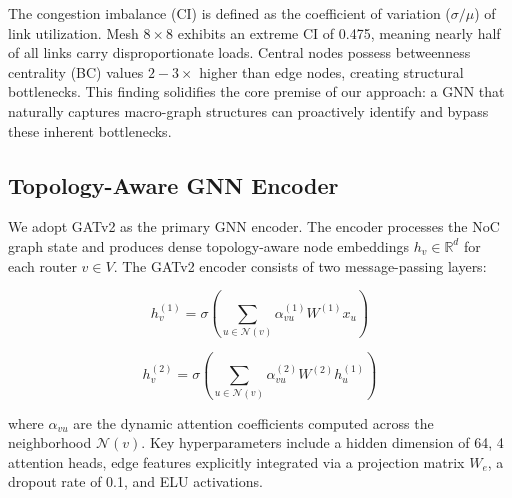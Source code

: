 \begin{table}[h]
\centering
\caption{Graph metrics across NoC topologies}
\label{tab:metrics}
\end{table}

The congestion imbalance (CI) is defined as the coefficient of variation ($\sigma/\mu$) of link utilization. Mesh $8\times8$ exhibits an extreme CI of 0.475, meaning nearly half of all links carry disproportionate loads. Central nodes possess betweenness centrality (BC) values $2-3\times$ higher than edge nodes, creating structural bottlenecks. This finding solidifies the core premise of our approach: a GNN that naturally captures macro-graph structures can proactively identify and bypass these inherent bottlenecks.

\subsection{Topology-Aware GNN Encoder}

We adopt GATv2 as the primary GNN encoder. The encoder processes the NoC graph state and produces dense topology-aware node embeddings $h_v \in \mathbb{R}^{d}$ for each router $v \in V$. The GATv2 encoder consists of two message-passing layers:

\begin{equation}
h_v^{(1)} = \sigma\left( \sum_{u \in \mathcal{N}(v)} \alpha_{vu}^{(1)} W^{(1)} x_u \right)
\end{equation}

\begin{equation}
h_v^{(2)} = \sigma\left( \sum_{u \in \mathcal{N}(v)} \alpha_{vu}^{(2)} W^{(2)} h_u^{(1)} \right)
\end{equation}

where $\alpha_{vu}$ are the dynamic attention coefficients computed across the neighborhood $\mathcal{N}(v)$. Key hyperparameters include a hidden dimension of 64, 4 attention heads, edge features explicitly integrated via a projection matrix $W_e$, a dropout rate of 0.1, and ELU activations.

